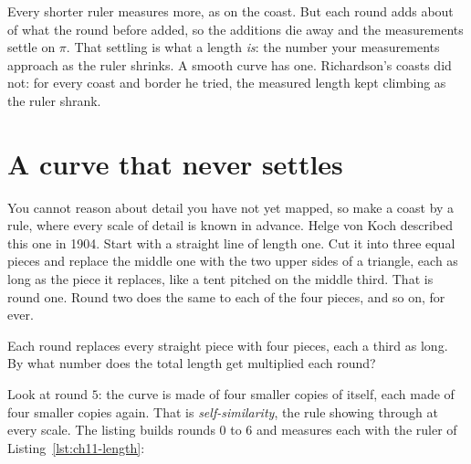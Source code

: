 

\noindent
Every shorter ruler measures more, as on the coast. But each round adds about
 of what the round before added, so the additions die
away and the measurements settle on $\pi$. That settling is what a length
\emph{is}: the number your measurements approach as the ruler shrinks. A
smooth curve has one. Richardson's coasts did not: for every coast and
border he tried, the measured length kept climbing as the ruler shrank.

\section{A curve that never settles}
\label{sec:ch11-koch}

\noindent
You cannot reason about detail you have not yet mapped, so make a coast by
a rule, where every scale of detail is known in advance. Helge von Koch
described this one in 1904. Start with a straight line of length one. Cut it
into three equal pieces and replace the middle one with the two upper sides
of a triangle, each as long as the piece it replaces, like a tent pitched on
the middle third. That is round one. Round two does the same to each of the
four pieces, and so on, for ever.

\begin{think}
Each round replaces every straight piece with four pieces, each a third as
long. By what number does the total length get multiplied each round?
\end{think}


\noindent
Look at round $5$: the curve is made of four smaller copies of itself, each
made of four smaller copies again. That is \emph{self-similarity}, the rule
showing through at every scale. The listing builds rounds $0$ to $6$ and
measures each with the ruler of Listing~\ref{lst:ch11-length}:

